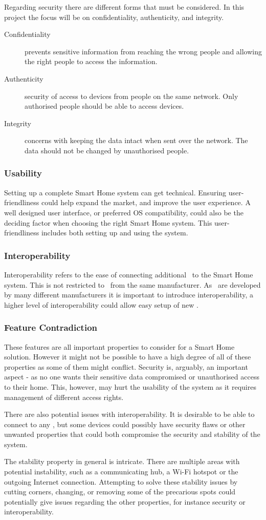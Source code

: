 Regarding security there are different forms that must be considered. In this project the focus will be on confidentiality, authenticity, and integrity.
\begin{description}
\item[Confidentiality] prevents sensitive information from reaching the wrong people and allowing the right people to access the information.
\item[Authenticity] security of access to devices from people on the same network. Only authorised people should be able to access devices.
\item[Integrity] concerns with keeping the data intact when sent over the network. The data should not be changed by unauthorised people. 
\end{description} 

\subsubsection{Usability}
Setting up a complete Smart Home system can get technical. Ensuring user-friendliness could help expand the market, and improve the user experience. A well designed user interface, or preferred OS compatibility, could also be the deciding factor when choosing the right Smart Home system. This user-friendliness includes both setting up and using the system.

\subsubsection{Interoperability}
Interoperability refers to the ease of connecting additional \sdevs~to the Smart Home system. This is not restricted to \sdevs~from the same manufacturer. As \sdevs~are developed by many different manufacturers it is important to introduce interoperability, a higher level of interoperability could allow easy setup of new \sdevs.

\subsubsection{Feature Contradiction}
These features are all important properties to consider for a Smart Home solution. However it might not be possible to have a high degree of all of these properties as some of them might conflict. Security is, arguably, an important aspect - as no one wants their sensitive data compromised or unauthorised access to their home. This, however, may hurt the usability of the system as it requires management of different access rights.

There are also potential issues with interoperability. It is desirable to be able to connect to any \sdevs, but some devices could possibly have security flaws or other unwanted properties that could both compromise the security and stability of the system.

The stability property in general is intricate. There are multiple areas with potential instability, such as a communicating hub, a Wi-Fi hotspot or the outgoing Internet connection. Attempting to solve these stability issues by cutting corners, changing, or removing some of the precarious spots could potentially give issues regarding the other properties, for instance security or interoperability. 